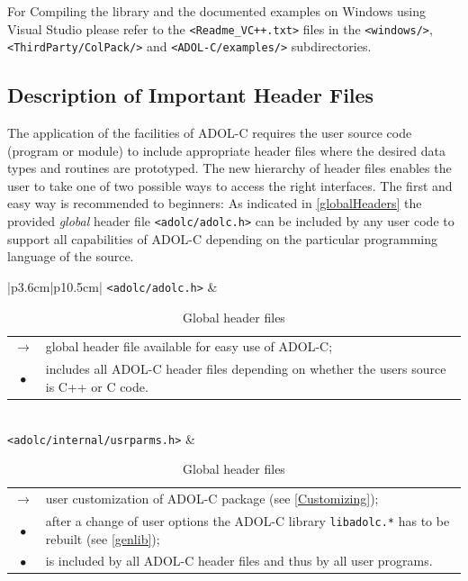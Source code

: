 \documentclass[11pt,twoside]{article}
\begin{document}
For Compiling the library and the documented examples on Windows using
Visual Studio please refer to the \verb=<Readme_VC++.txt>= files in 
the \verb=<windows/>=, \verb=<ThirdParty/ColPack/>= and 
\verb=<ADOL-C/examples/>= subdirectories.
%
\subsection{Description of Important Header Files}
\label{ssec:DesIH}
%
The application of the facilities of ADOL-C requires the user 
source code (program or module) to include appropriate 
header files where the desired data types and routines are 
prototyped. The new hierarchy of header files enables the user
to take one of two possible ways to access the right interfaces.
The first and easy way is recommended to beginners: As indicated in
\autoref{globalHeaders} the provided {\em global} header file 
\verb=<adolc/adolc.h>= can be included by any user code to support all
capabilities of ADOL-C depending on the particular programming language
of the source.    

\begin{table}[h]
\center \small
\begin{tabular}{|p{3.6cm}|p{10.5cm}|}\hline
\verb=<adolc/adolc.h>= & 
\begin{tabular*}{10.5cm}{cp{9.5cm}}
  \boldmath $\rightarrow$ \unboldmath
                 & global header file available for easy use of ADOL-C; \\
  $\bullet$      & includes all ADOL-C header files depending on
                   whether the users source is C++ or C code.
\end{tabular*}
\\ \hline
\verb=<adolc/internal/usrparms.h>= &
\begin{tabular*}{10.5cm}{cp{9.5cm}}
  \boldmath $\rightarrow$ \unboldmath
                 & user customization of ADOL-C package (see
                   \autoref{Customizing}); \\
  $\bullet$      & after a change of
                   user options the ADOL-C library \verb=libadolc.*=
                   has to be rebuilt (see \autoref{genlib}); \\
  $\bullet$      & is included by all ADOL-C header files and thus by all user
                   programs.
\end{tabular*} \\ \hline
\end{tabular}
\caption{Global header files}
\label{globalHeaders}
\end{table}  
\end{document}
